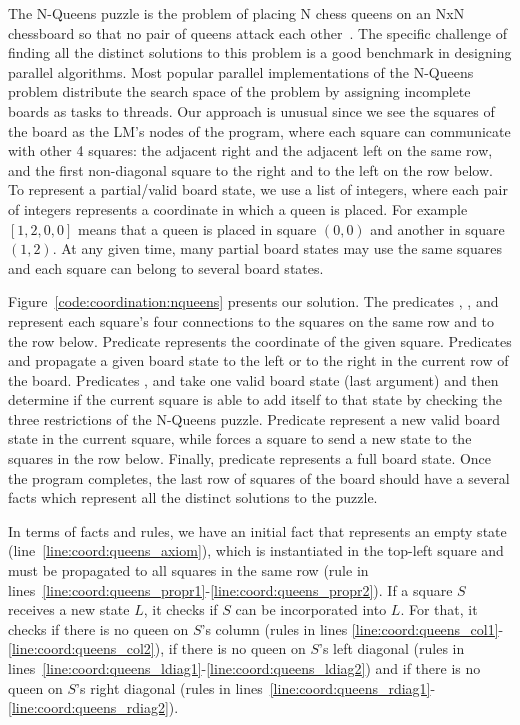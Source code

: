 The N-Queens puzzle is the problem of placing N chess queens on an NxN
chessboard so that no pair of queens attack each other~\cite{8queens}. The
specific challenge of finding all the distinct solutions to this problem is a
good benchmark in designing parallel algorithms.  Most popular parallel
implementations of the N-Queens problem distribute the search space of the
problem by assigning incomplete boards as tasks to threads.  Our approach is
unusual since we see the squares of the board as the LM's nodes of the program,
where each square can communicate with other 4 squares: the adjacent right and
the adjacent left on the same row, and the first non-diagonal square to the
right and to the left on the row below. To represent a partial/valid board
state, we use a list of integers, where each pair of integers represents a
coordinate in which a queen is placed. For example $[1, 2, 0, 0]$ means that a
queen is placed in square $(0, 0)$ and another in square $(1, 2)$. At any given
time, many partial board states may use the same squares and each square can
belong to several board states.

Figure~\ref{code:coordination:nqueens} presents our solution. The predicates
, ,  and  represent each
square's four connections to the squares on the same row and to the row below.
Predicate  represents the coordinate of the given square.
Predicates  and  propagate a given
board state to the left or to the right in the current row of the board.
Predicates ,  and  take
one valid board state (last argument) and then determine if the current square
is able to add itself to that state by checking the three restrictions of the
N-Queens puzzle. Predicate  represent a new valid board state in
the current square, while  forces a square to send a new state
to the squares in the row below. Finally, predicate 
represents a full board state. Once the program completes, the last row of
squares of the board should have a several  facts which
represent all the distinct solutions to the puzzle.

In terms of facts and rules, we have an initial fact that represents an empty
state (line~\ref{line:coord:queens_axiom}), which is instantiated in the
top-left square and must be propagated to all squares in the same row (rule in
lines~\ref{line:coord:queens_propr1}-\ref{line:coord:queens_propr2}). If a
square $S$ receives a new state $L$, it checks if $S$ can be incorporated into
$L$. For that, it checks if there is no queen on $S$'s column (rules in lines
\ref{line:coord:queens_col1}-\ref{line:coord:queens_col2}), if there is no queen
on $S$'s left diagonal (rules in
lines~\ref{line:coord:queens_ldiag1}-\ref{line:coord:queens_ldiag2}) and if
there is no queen on $S$'s right diagonal (rules in
lines~\ref{line:coord:queens_rdiag1}-\ref{line:coord:queens_rdiag2}).

